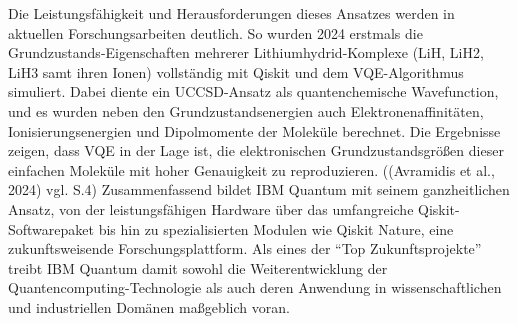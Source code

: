 Die Leistungsfähigkeit und Herausforderungen dieses Ansatzes werden in aktuellen Forschungsarbeiten deutlich. So wurden 2024 erstmals die Grundzustands-Eigenschaften mehrerer Lithiumhydrid-Komplexe (LiH, LiH2, LiH3 samt ihren Ionen) vollständig mit Qiskit und dem VQE-Algorithmus simuliert. Dabei diente ein UCCSD-Ansatz als quantenchemische Wavefunction, und es wurden neben den Grundzustandsenergien auch Elektronenaffinitäten, Ionisierungsenergien und Dipolmomente der Moleküle berechnet. Die Ergebnisse zeigen, dass VQE in der Lage ist, die elektronischen Grundzustandsgrößen dieser einfachen Moleküle mit hoher Genauigkeit zu reproduzieren. ((Avramidis et al., 2024) vgl. S.4)
Zusammenfassend bildet IBM Quantum mit seinem ganzheitlichen Ansatz, von der leistungsfähigen Hardware über das umfangreiche Qiskit-Softwarepaket bis hin zu spezialisierten Modulen wie Qiskit Nature, eine zukunftsweisende Forschungsplattform. Als eines der “Top Zukunftsprojekte” treibt IBM Quantum damit sowohl die Weiterentwicklung der Quantencomputing-Technologie als auch deren Anwendung in wissenschaftlichen und industriellen Domänen maßgeblich voran.

